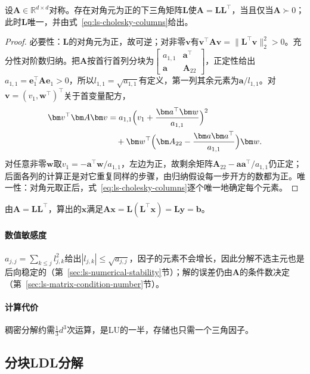 \begin{theorem}[Cholesky分解的存在与唯一]
\label{thm:ls-cholesky-existence}
设$\bm A\in\mathbb R^{d\times d}$对称。存在对角元为正的下三角矩阵$\bm L$使$\bm A=\bm L\bm L^\top$，当且仅当$\bm A\succ0$；此时$\bm L$唯一，并由式~\eqref{eq:ls-cholesky-columns}给出。
\end{theorem}
\begin{proof}
必要性：$\bm L$的对角元为正，故可逆；对非零$\bm v$有$\bm v^\top\bm A\bm v=\lVert\bm L^\top\bm v\rVert_2^2>0$。充分性对阶数归纳。把$\bm A$按首行首列分块为$\left[\begin{smallmatrix}a_{1,1}&\bm a^\top\\\bm a&\bm A_{22}\end{smallmatrix}\right]$，正定性给出$a_{1,1}=\bm e_1^\top\bm A\bm e_1>0$，所以$l_{1,1}=\sqrt{a_{1,1}}$有定义，第一列其余元素为$\bm a/l_{1,1}$。对$\bm v=(v_1,\bm w^\top)^\top$关于首变量配方，
\[
\begin{aligned}
 \bm v^\top\bm A\bm v
 &=a_{1,1}\Bigl(v_1+\frac{\bm a^\top\bm w}{a_{1,1}}\Bigr)^2\\
 &\quad+\bm w^\top\Bigl(\bm A_{22}-\frac{\bm a\bm a^\top}{a_{1,1}}\Bigr)\bm w .
\end{aligned}
\]
对任意非零$\bm w$取$v_1=-\bm a^\top\bm w/a_{1,1}$，左边为正，故剩余矩阵$\bm A_{22}-\bm a\bm a^\top/a_{1,1}$仍正定；后面各列的计算正是对它重复同样的步骤，由归纳假设每一步开方的数都为正。唯一性：对角元取正后，式~\eqref{eq:ls-cholesky-columns}逐个唯一地确定每个元素。
\end{proof}

由$\bm A=\bm L\bm L^\top$，算出的$\bm x$满足$\bm A\bm x=\bm L(\bm L^\top\bm x)=\bm L\bm y=\bm b$。

\paragraph{数值敏感度}
$a_{j,j}=\sum_{k\leq j}l_{j,k}^2$给出$|l_{j,k}|\leq\sqrt{a_{j,j}}$，因子的元素不会增长，因此分解不选主元也是后向稳定的（第~\ref{sec:ls-numerical-stability}节）；解的误差仍由$\bm A$的条件数决定（第~\ref{sec:ls-matrix-condition-number}节）。

\paragraph{计算代价}
稠密分解约需$\tfrac13d^3$次运算，是LU的一半，存储也只需一个三角因子。

\subsection{分块LDL分解}
\label{sec:ls-ldlt}

